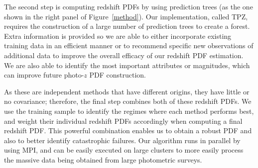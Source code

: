 \documentclass[11pt,twoside]{article}
\begin{document}
The second step is computing redshift PDFs by using prediction trees (as the one shown in the right panel of Figure~\ref{method}). Our implementation, called TPZ, requires the construction of a large number of prediction trees to create a forest. Extra information is provided so we are able to either incorporate existing training data in an efficient manner or to recommend specific new observations of additional data to improve the overall efficacy of our redshift PDF estimation. We are also able to identify the most important attributes or magnitudes, which can improve future photo-$z$ PDF construction.


As these are independent methods that have different origins, they have little or no covariance; therefore, the final step combines both of these redshift PDFs. We use the training sample to identify the regimes where each method performs best, and weight their individual redshift PDFs accordingly when computing a final redshift PDF. This powerful combination enables us to obtain a robust PDF and also to better identify catastrophic failures. Our algorithm runs in parallel by using MPI, and can be easily executed on large clusters to more easily process the massive data being obtained from large photometric surveys.
\end{document}
